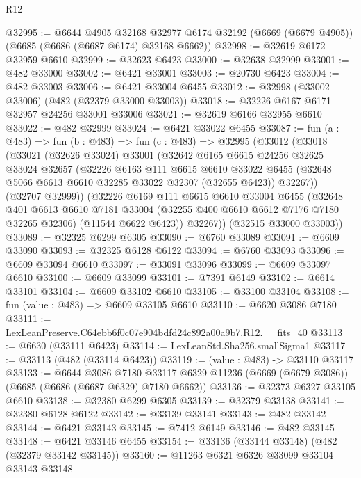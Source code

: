 \begin{lexlean}{R12}
\begin{coremodule}
@32995 := @6644
    @4905
    @32168
    @32977
    @6174
    @32192
    (@6669 (@6679 @4905))
    (@6685 (@6686 (@6687 @6174) @32168 @6662))
@32998 := @32619 @6172 @32959 @6610
@32999 := @32623 @6423
@33000 := @32638 @32999
@33001 := @482 @33000
@33002 := @6421 @33001
@33003 := @20730 @6423
@33004 := @482 @33003
@33006 := @6421 @33004 @6455
@33012 := @32998 (@33002 @33006) (@482 (@32379 @33000 @33003))
@33018 := @32226 @6167 @6171 @32957 @24256 @33001 @33006
@33021 := @32619 @6166 @32955 @6610
@33022 := @482 @32999
@33024 := @6421 @33022 @6455
@33087 := fun (a : @483) =>
  fun (b : @483) =>
  fun (c : @483) =>
  @32995
    (@33012
      (@33018
        (@33021
          (@32626 @33024)
          @33001
          (@32642
            @6165
            @6615
            @24256
            @32625
            @33024
            @32657
            (@32226
              @6163
              @111
              @6615
              @6610
              @33022
              @6455
              (@32648 @5066 @6613 @6610 @32285 @33022 @32307 (@32655 @6423))
              @32267))
          (@32707 @32999))
        (@32226
          @6169
          @111
          @6615
          @6610
          @33004
          @6455
          (@32648
            @401
            @6613
            @6610
            @7181
            @33004
            (@32255 @400 @6610 @6612 @7176 @7180 @32265 @32306)
            (@11544 @6622 @6423))
          @32267))
      (@32515 @33000 @33003))
@33089 := @32325 @6299 @6305
@33090 := @6760 @33089
@33091 := @6609 @33090
@33093 := @32325 @6128 @6122
@33094 := @6760 @33093
@33096 := @6609 @33094 @6610
@33097 := @33091 @33096
@33099 := @6609 @33097 @6610
@33100 := @6609 @33099
@33101 := @7391 @6149
@33102 := @6614 @33101
@33104 := @6609 @33102 @6610
@33105 := @33100 @33104
@33108 := fun (value : @483) => @6609 @33105 @6610
@33110 := @6620 @3086 @7180
@33111 := LexLeanPreserve.C64ebb6f0c07e904bdfd24c892a00a9b7.R12.__fits_40
@33113 := @6630 (@33111 @6423)
@33114 := LexLeanStd.Sha256.smallSigma1
@33117 := @33113 (@482 (@33114 @6423))
@33119 := (value : @483) -> @33110 @33117
@33133 := @6644
    @3086
    @7180
    @33117
    @6329
    @11236
    (@6669 (@6679 @3086))
    (@6685 (@6686 (@6687 @6329) @7180 @6662))
@33136 := @32373 @6327 @33105 @6610
@33138 := @32380 @6299 @6305
@33139 := @32379 @33138
@33141 := @32380 @6128 @6122
@33142 := @33139 @33141
@33143 := @482 @33142
@33144 := @6421 @33143
@33145 := @7412 @6149
@33146 := @482 @33145
@33148 := @6421 @33146 @6455
@33154 := @33136 (@33144 @33148) (@482 (@32379 @33142 @33145))
@33160 := @11263 @6321 @6326 @33099 @33104 @33143 @33148

\end{coremodule}
\end{lexlean}
